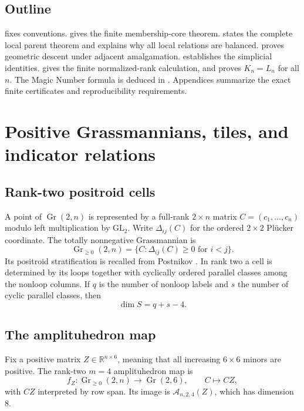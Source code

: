 \documentclass[11pt]{article}
\newcommand{\Gr}{\operatorname{Gr}}
\newcommand{\A}{\mathcal A}
\newcommand{\R}{\mathbb R}
\newcommand{\1}{\mathbf 1}
\begin{document}
\subsection*{Outline}
 fixes conventions.   gives the
finite membership-core theorem.   states the complete
local parent theorem and explains why all local relations are balanced.
 proves geometric descent under adjacent
amalgamation.   establishes the simplicial identities.
 gives the finite normalized-rank calculation, and
 proves $K_n=L_n$ for all $n$.  The Magic Number formula is
deduced in .  Appendices summarize the exact finite
certificates and reproducibility requirements.

\section{Positive Grassmannians, tiles, and indicator relations}
\label{sec:background}

\subsection{Rank-two positroid cells}
A point of $\Gr(2,n)$ is represented by a full-rank $2\times n$ matrix
$C=(c_1,\dots,c_n)$ modulo left multiplication by $\mathrm{GL}_2$.  Write
$\Delta_{ij}(C)$ for the ordered $2\times2$ Pl\"ucker coordinate.  The
totally nonnegative Grassmannian is
\[
\Gr_{\ge0}(2,n)=\{C:\Delta_{ij}(C)\ge0\text{ for }i<j\}.
\]
Its positroid stratification is recalled from Postnikov \cite{Postnikov}.
In rank two a cell is determined by its loops together with cyclically
ordered parallel classes among the nonloop columns.  If $q$ is the number
of nonloop labels and $s$ the number of cyclic parallel classes, then
\begin{equation}\label{eq:rank2dim}
\dim S=q+s-4.
\end{equation}

\subsection{The amplituhedron map}
Fix a positive matrix $Z\in\R^{n\times 6}$, meaning that all increasing
$6\times6$ minors are positive.  The rank-two $m=4$ amplituhedron map is
\[
f_Z:\Gr_{\ge0}(2,n)\longrightarrow \Gr(2,6),\qquad C\longmapsto CZ,
\]
with $CZ$ interpreted by row span.  Its image is $\A_{n,2,4}(Z)$, which has
dimension $8$.
\end{document}
